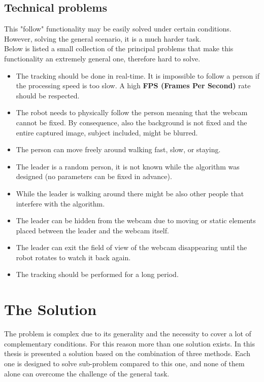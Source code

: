 \subsection{Technical problems}\label{sec:technicalProblems}
This "follow" functionality may be easily solved under certain conditions. However, solving the general scenario, it is a much harder task.\\
Below is listed a small collection of the principal problems that make this functionality an extremely general one, therefore hard to solve.
\begin{itemize}
	\item The tracking should be done in real-time. It is impossible to follow a person if the processing speed is too slow. A high \textbf{FPS (Frames Per Second)} rate should be respected.
	\item The robot needs to physically follow the person meaning that the webcam cannot be fixed. By consequence, also the background is not fixed and the entire captured image, subject included, might be blurred.
	\item The person can move freely around walking fast, slow, or staying.
	\item The leader is a random person, it is not known while the algorithm was designed (no parameters can be fixed in advance).
	\item While the leader is walking around there might be also other people that interfere with the algorithm.
	\item The leader can be hidden from the webcam due to moving or static elements placed between the leader and the webcam itself.
	\item The leader can exit the field of view of the webcam disappearing until the robot rotates to watch it back again.
	\item The tracking should be performed for a long period.
\end{itemize}


\section{The Solution}
The problem is complex due to its generality and the necessity to cover a lot of complementary conditions. For this reason more than one solution exists. In this thesis is presented a solution based on the combination of three methods. Each one is designed to solve sub-problem compared to this one, and none of them alone can overcome the challenge of the general task.\\

